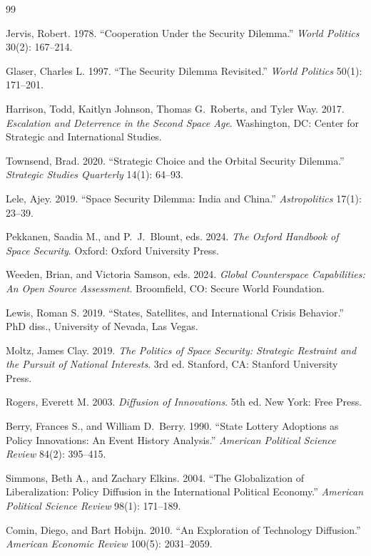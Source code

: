 \documentclass[11pt]{article}
\begin{document}
\begin{thebibliography}{99}

Jervis, Robert. 1978.
``Cooperation Under the Security Dilemma.''
\textit{World Politics} 30(2): 167--214.

Glaser, Charles L. 1997.
``The Security Dilemma Revisited.''
\textit{World Politics} 50(1): 171--201.

Harrison, Todd, Kaitlyn Johnson, Thomas G.\ Roberts, and Tyler Way. 2017.
\textit{Escalation and Deterrence in the Second Space Age}.
Washington, DC: Center for Strategic and International Studies.

Townsend, Brad. 2020.
``Strategic Choice and the Orbital Security Dilemma.''
\textit{Strategic Studies Quarterly} 14(1): 64--93.

Lele, Ajey. 2019.
``Space Security Dilemma: India and China.''
\textit{Astropolitics} 17(1): 23--39.

Pekkanen, Saadia M., and P.\ J.\ Blount, eds. 2024.
\textit{The Oxford Handbook of Space Security}.
Oxford: Oxford University Press.

Weeden, Brian, and Victoria Samson, eds. 2024.
\textit{Global Counterspace Capabilities: An Open Source Assessment}.
Broomfield, CO: Secure World Foundation.

Lewis, Roman S. 2019.
``States, Satellites, and International Crisis Behavior.''
PhD diss., University of Nevada, Las Vegas.

Moltz, James Clay. 2019.
\textit{The Politics of Space Security: Strategic Restraint and the Pursuit of National Interests}. 3rd ed.
Stanford, CA: Stanford University Press.

Rogers, Everett M. 2003.
\textit{Diffusion of Innovations}. 5th ed.
New York: Free Press.

Berry, Frances S., and William D.\ Berry. 1990.
``State Lottery Adoptions as Policy Innovations: An Event History Analysis.''
\textit{American Political Science Review} 84(2): 395--415.

Simmons, Beth A., and Zachary Elkins. 2004.
``The Globalization of Liberalization: Policy Diffusion in the International Political Economy.''
\textit{American Political Science Review} 98(1): 171--189.

Comin, Diego, and Bart Hobijn. 2010.
``An Exploration of Technology Diffusion.''
\textit{American Economic Review} 100(5): 2031--2059.


\end{thebibliography}
\end{document}
